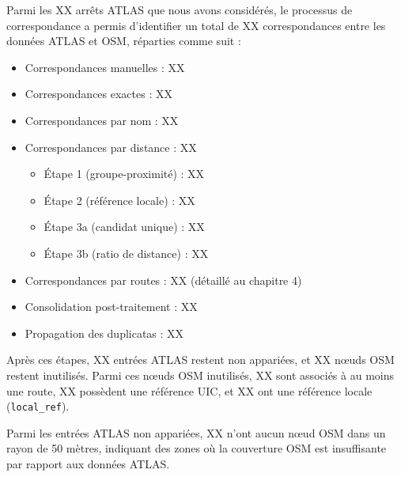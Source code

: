 Parmi les XX arrêts ATLAS que nous avons considérés, le processus de correspondance a permis d'identifier un total de XX correspondances entre les données ATLAS et OSM, réparties comme suit :

\begin{itemize}
    \item Correspondances manuelles : XX
    \item Correspondances exactes : XX
    \item Correspondances par nom : XX
    \item Correspondances par distance : XX
    \begin{itemize}
        \item Étape 1 (groupe-proximité) : XX
        \item Étape 2 (référence locale) : XX
        \item Étape 3a (candidat unique) : XX
        \item Étape 3b (ratio de distance) : XX
    \end{itemize}
    \item Correspondances par routes : XX (détaillé au chapitre 4)
    \item Consolidation post-traitement : XX
    \item Propagation des duplicatas : XX
\end{itemize}

Après ces étapes, XX entrées ATLAS restent non appariées, et XX nœuds OSM restent inutilisés. Parmi ces nœuds OSM inutilisés, XX sont associés à au moins une route, XX possèdent une référence UIC, et XX ont une référence locale (\texttt{local\_ref}).

Parmi les entrées ATLAS non appariées, XX n'ont aucun nœud OSM dans un rayon de 50 mètres, indiquant des zones où la couverture OSM est insuffisante par rapport aux données ATLAS.


